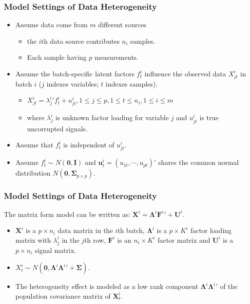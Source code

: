 \documentclass{beamer}
\begin{document}

\begin{frame}
\frametitle{Model Settings of Data Heterogeneity}

\begin{itemize}
\item Assume data come from $m$ different sources
    \begin{itemize}
    	\item the $i$th data source contributes $n_i$ samples.
    	\item Each sample having $p$ measurements.
    \end{itemize}
\item Assume the batch-specific latent factors $f_t^i$ influence the observed data $X_{jt}^i$ in batch $i$ ($j$ indexes variables; $t$ indexes samples).
    \begin{itemize}
    	\item $X_{jt}^i = {\lambda_j^i}'f_t^i + u_{jt}^i, 1 \leq j \leq p, 1 \leq t \leq n_i, 1 \leq i \leq m$
    	\item where $\lambda_j^i$ is unknown factor loading for variable $j$ and $u_{jt}^i$ is true uncorrupted signals. 
    \end{itemize}
\item Assume that $f_t^i$ is independent of $u_{jt}^i$.
\item Assume $f_t^i \sim N(\mathbf{0}, \mathbf{I})$ and $\mathbf{u}_t^i = (u_{1t}, \cdots, u_{pt})'$ shares the common normal distribution $N(\mathbf{0}, \boldsymbol{\Sigma}_{p \times p})$.
\end{itemize}

\end{frame}


\begin{frame}
\frametitle{Model Settings of Data Heterogeneity}

The matrix form model can be written as: $\mathbf{X}^i = \boldsymbol{\Lambda}^i {\mathbf{F}^i}' + \mathbf{U}^i$.
\begin{itemize}
	\item $\mathbf{X}^i$ is a $p \times n_i$ data matrix in the $i$th batch, $\boldsymbol{\Lambda}^i$ is a $p \times K^i$ factor loading matrix with $\lambda_j^i$ in the $j$th row, $\mathbf{F}^i$ is an $n_i \times K^i$ factor matrix and $\mathbf{U}^i$ is a $p \times n_i$ signal matrix.
	\item $X_t^i \sim N(\mathbf{0}, \boldsymbol{\Lambda}^i {\boldsymbol{\Lambda}^i}' + \boldsymbol{\Sigma})$.
	\item The heterogeneity effect is modeled as a low rank component $\boldsymbol{\Lambda}^i {\boldsymbol{\Lambda}^i}'$ of the population covariance matrix of $\mathbf{X}_t^i$.
\end{itemize}
\end{frame}
\end{document}

